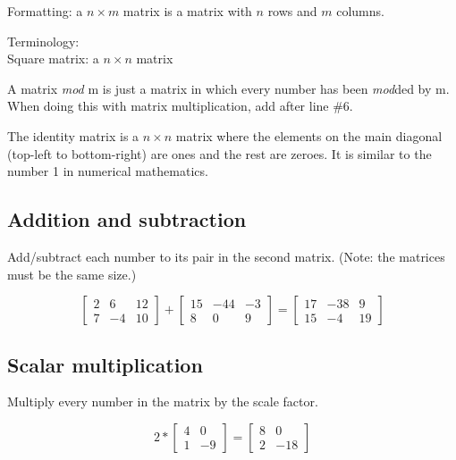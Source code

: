 
Formatting: a $n \times m$ matrix is a matrix with $n$ rows and $m$ columns.

Terminology:\\
Square matrix: a $n \times n$ matrix

A matrix \textit{mod} m is just a matrix in which every number has been \textit{mod}ded by m. When doing this with matrix multiplication, add  after line \#6.

The identity matrix is a $n \times n$ matrix where the elements on the main diagonal (top-left to bottom-right) are ones and the rest are zeroes. It is similar to the number 1 in numerical mathematics. 

\subsection*{Addition and subtraction}

Add/subtract each number to its pair in the second matrix. (Note: the matrices must be the same size.)

\begin{equation*}
    \begin{bmatrix}
        2 & 6 & 12 \\
        7 & -4 & 10
    \end{bmatrix}
    +
    \begin{bmatrix}
        15 & -44 & -3 \\
        8 & 0 & 9
    \end{bmatrix}
    =
    \begin{bmatrix}
        17 & -38 & 9 \\
        15 & -4 & 19
    \end{bmatrix}
\end{equation*}

\subsection*{Scalar multiplication}

Multiply every number in the matrix by the scale factor.

\begin{equation*}
    2 * 
    \begin{bmatrix}
        4 & 0 \\
        1 & -9
    \end{bmatrix}
    =
    \begin{bmatrix}
        8 & 0 \\
        2 & -18
    \end{bmatrix}
\end{equation*}

